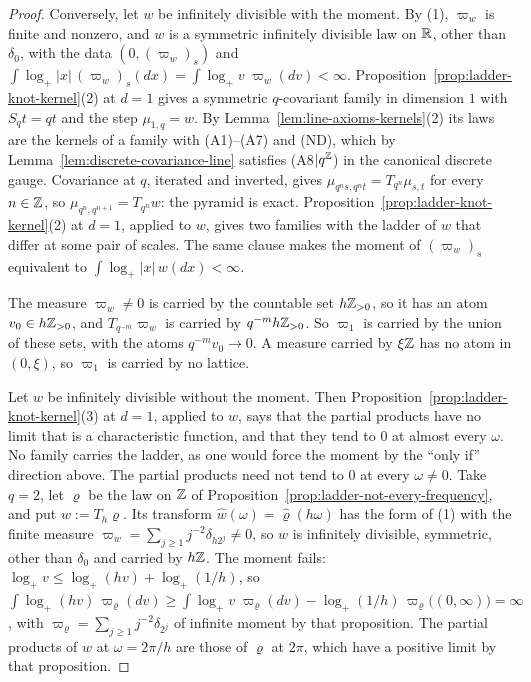 \begin{proof}
Conversely, let $w$ be infinitely divisible with the moment. By (1), $\varpi_w$ is finite and
nonzero, and $w$ is a symmetric infinitely divisible law on $\mathbb{R}$, other than $\delta_0$, with the
data $(0, (\varpi_w)_s)$ and $\int\log_+|x|\,(\varpi_w)_s(dx) = \int\log_+v\;\varpi_w(dv) < \infty$.
Proposition~\ref{prop:ladder-knot-kernel}(2) at $d = 1$ gives a symmetric $q$-covariant family in
dimension $1$ with $S_qt = qt$ and the step $\mu_{1,q} = w$. By
Lemma~\ref{lem:line-axioms-kernels}(2) its laws are the kernels of a family with (A1)--(A7) and
(ND), which by Lemma~\ref{lem:discrete-covariance-line} satisfies (A8$|q^{\mathbb{Z}}$) in the canonical
discrete gauge. Covariance at $q$, iterated and inverted, gives
$\mu_{q^ns,q^nt} = T_{q^n}\mu_{s,t}$ for every $n \in \mathbb{Z}$, so
$\mu_{q^n,q^{n+1}} = T_{q^n}w$: the pyramid is exact. Proposition~\ref{prop:ladder-knot-kernel}(2)
at $d = 1$, applied to $w$, gives two families with the ladder of $w$ that differ at some pair
of scales. The same clause makes the moment of $(\varpi_w)_s$ equivalent to
$\int\log_+|x|\,w(dx) < \infty$.

The measure $\varpi_w \ne 0$ is carried by the countable set $h\mathbb{Z}_{>0}$, so it has an atom
$v_0 \in h\mathbb{Z}_{>0}$, and $T_{q^{-m}}\varpi_w$ is carried by $q^{-m}h\mathbb{Z}_{>0}$. So $\varpi_1$ is
carried by the union of these sets, with the atoms $q^{-m}v_0 \to 0$. A measure carried by $\xi\mathbb{Z}$
has no atom in $(0, \xi)$, so $\varpi_1$ is carried by no lattice.

Let $w$ be infinitely divisible without the moment. Then
Proposition~\ref{prop:ladder-knot-kernel}(3) at $d = 1$, applied to $w$, says that the partial
products have no limit that is a characteristic function, and that they tend to $0$ at almost
every $\omega$. No family
carries the ladder, as one would force the moment by the ``only if'' direction above. The partial
products need not tend to $0$ at every $\omega \ne 0$. Take $q = 2$, let $\varrho$ be the law on
$\mathbb{Z}$ of Proposition~\ref{prop:ladder-not-every-frequency}, and put
$w := T_h\varrho$. Its transform $\widehat w(\omega) = \widehat\varrho(h\omega)$ has the form of
(1) with the finite measure $\varpi_w = \sum_{j \ge 1}j^{-2}\delta_{h2^j} \ne 0$, so $w$ is
infinitely divisible, symmetric, other than $\delta_0$ and carried by $h\mathbb{Z}$. The moment fails:
$\log_+v \le \log_+(hv) + \log_+(1/h)$, so
$\int\log_+(hv)\,\varpi_\varrho(dv) \ge \int\log_+v\;\varpi_\varrho(dv) -
\log_+(1/h)\,\varpi_\varrho\bigl((0,\infty)\bigr) = \infty$, with $\varpi_\varrho = \sum_{j \ge
1}j^{-2}\delta_{2^j}$ of infinite moment by that proposition. The partial products of $w$ at
$\omega = 2\pi/h$ are those of $\varrho$ at $2\pi$, which have a positive limit by that
proposition.


\end{proof}
